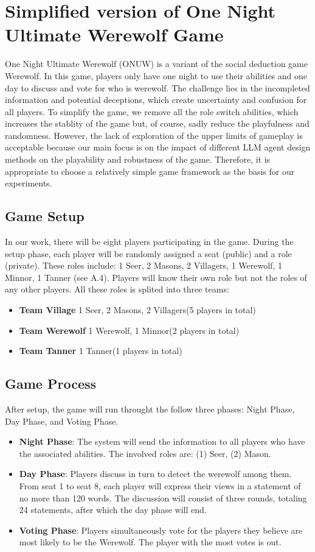 
\section{Simplified version of One Night Ultimate Werewolf Game} 

\label{sec:Appendix_ONUW_game}
One Night Ultimate Werewolf (ONUW) is a variant of the social deduction game Werewolf. In this game, players only have one night to use their abilities and one day to discuss and vote for who is werewolf. The challenge lies in the incompleted information and potential deceptions, which create uncertainty and confusion for all players. To simplify the game, we remove all the role switch abilities, which increases the stablity of the game but, of course, sadly reduce the playfulness and randomness. However, the lack of exploration of the upper limits of gameplay is acceptable because our main focus is on the impact of different LLM agent design methods on the playability and robustness of the game. Therefore, it is appropriate to choose a relatively simple game framework as the basis for our experiments.
%
\subsection{Game Setup}
In our work, there will be eight players participating in the game. During the setup phase, each player will be randomly assigned a seat (public) and a role (private). These roles include: 1 Seer, 2 Masons, 2 Villagers, 1 Werewolf,  1 Minnor, 1 Tanner (see A.4). Players will know their own role but not the roles of any other players. All these roles is splited into three teams:
\begin{itemize}
    \item \textbf{Team Village} 1 Seer, 2 Masons, 2 Villagers(5 players in total)
    \item \textbf{Team Werewolf} 1 Werewolf, 1 Minnor(2 players in total)
    \item \textbf{Team Tanner} 1 Tanner(1 players in total)
\end{itemize}

\subsection{Game Process}
After setup, the game will run throught the follow three phases: Night Phase, Day Phase, and Voting Phase.
\begin{itemize}
    \item \textbf{Night Phase}:  The system will send the information to all players who have the associated abilities. The involved roles are: (1) Seer, (2) Mason.
    \item \textbf{Day Phase}: Players discuss in turn to detect the werewolf among them. From seat 1 to seat 8, each player will express their views in a statement of no more than 120 words. The discussion will consist of three rounds, totaling 24 statements, after which the day phase will end.
    \item \textbf{Voting Phase}: Players simultaneously vote for the players they believe are most likely to be the Werewolf. The player with the most votes is out.  
\end{itemize}


